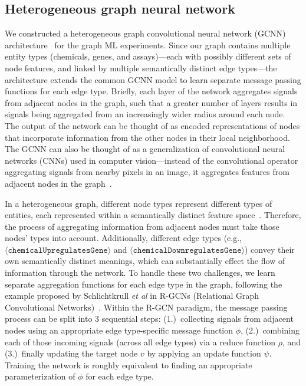 \documentclass{ws-procs11x85}
\begin{document}
\subsection{Heterogeneous graph neural network}
We constructed a heterogeneous graph convolutional neural network (GCNN) architecture~\cite{kipf2016semi} for the graph ML experiments.
Since our graph contains multiple entity types (chemicals, genes, and assays)---each with possibly different sets of node features, and linked by multiple semantically distinct edge types---the architecture extends the common GCNN model to learn separate message passing functions for each edge type.
Briefly, each layer of the network aggregates signals from adjacent nodes in the graph, such that a greater number of layers results in signals being aggregated from an increasingly wider radius around each node.
The output of the network can be thought of as encoded representations of nodes that incorporate information from the other nodes in their local neighborhood.
The GCNN can also be thought of as a generalization of convolutional neural networks (CNNs) used in computer vision---instead of the convolutional operator aggregating signals from nearby pixels in an image, it aggregates features from adjacent nodes in the graph~\cite{chen2019multi}.

In a heterogeneous graph, different node types represent different types of entities, each represented within a semantically distinct feature space~\cite{zhang2019heterogeneous}.
Therefore, the process of aggregating information from adjacent nodes must take those nodes' types into account.
Additionally, different edge types (e.g., $\langle \mathtt{chemicalUpregulatesGene}\rangle$ and $\langle \mathtt{chemicalDownregulatesGene}\rangle$) convey their own semantically distinct meanings, which can substantially effect the flow of information through the network.
To handle these two challenges, we learn separate aggregation functions for each edge type in the graph, following the example proposed by Schlichtkrull \textit{et al} in R-GCNs (Relational Graph Convolutional Networks)~\cite{schlichtkrull2018modeling}.
Within the R-GCN paradigm, the message passing process can be split into 3 sequential steps: (1.)~collecting signals from adjacent nodes using an appropriate edge type-specific message function $\phi$, (2.)~combining each of those incoming signals (across all edge types) via a reduce function $\rho$, and (3.)~finally updating the target node $v$ by applying an update function $\psi$.
Training the network is roughly equivalent to finding an appropriate parameterization of $\phi$ for each edge type.
\end{document}
